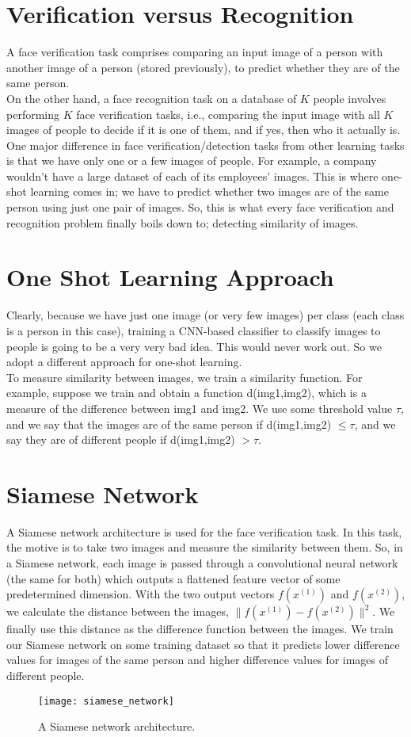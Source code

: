 \documentclass[a4paper, 12pt]{report}
\begin{document}
\section{Verification versus Recognition}
A face verification task comprises comparing an input image of a person with another image of a person (stored previously), to predict whether they are of the same person.\\
\break
On the other hand, a face recognition task on a database of $K$ people involves performing $K$ face verification tasks, i.e., comparing the input image with all $K$ images of people to decide if it is one of them, and if yes, then who it actually is.\\
\break
One major difference in face verification/detection tasks from other learning tasks is that we have only one or a few images of people. For example, a company wouldn't have a large dataset of each of its employees' images. This is where one-shot learning comes in; we have to predict whether two images are of the same person using just one pair of images. So, this is what every face verification and recognition problem finally boils down to; detecting similarity of images.

\section{One Shot Learning Approach}
Clearly, because we have just one image (or very few images) per class (each class is a person in this case), training a CNN-based classifier to classify images to people is going to be a very very bad idea. This would never work out. So we adopt a different approach for one-shot learning.\\
\break
To measure similarity between images, we train a similarity function. For example, suppose we train and obtain a function d(img1,img2), which is a measure of the difference between img1 and img2. We use some threshold value $\tau$, and we say that the images are of the same person if d(img1,img2) $\leq\tau$, and we say they are of different people if d(img1,img2) $>\tau$.

\section{Siamese Network}
A Siamese network architecture is used for the face verification task. In this task, the motive is to take two images and measure the similarity between them. So, in a Siamese network, each image is passed through a convolutional neural network (the same for both) which outputs a flattened feature vector of some predetermined dimension. With the two output vectors $f(x^{(1)})$ and $f(x^{(2)})$, we calculate the distance between the images, $\lVert f(x^{(1)})-f(x^{(2)})\rVert^2$. We finally use this distance as the difference function between the images. We train our Siamese network on some training dataset so that it predicts lower difference values for images of the same person and higher difference values for images of different people.
\begin{figure}[H]
\centering
\texttt{[image: siamese\_network]}
\caption{A Siamese network architecture.}
\end{figure}
\end{document}
